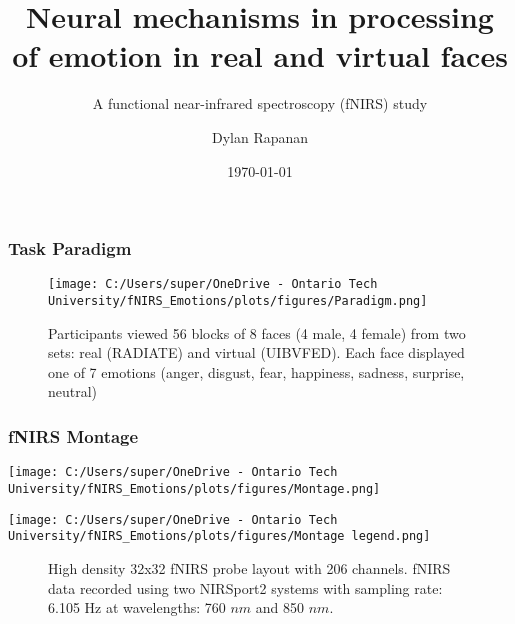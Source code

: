 \documentclass{beamer}
\title{Neural mechanisms in processing of emotion in real and virtual faces}
\subtitle{A functional near-infrared spectroscopy (fNIRS) study}
\author{Dylan Rapanan}
\date{\today}
\begin{document}
\begin{frame}
    \titlepage
\end{frame}

\begin{frame}
    \frametitle{Task Paradigm}
    \begin{figure}
        \centering
        \texttt{[image: C:/Users/super/OneDrive - Ontario Tech University/fNIRS\_Emotions/plots/figures/Paradigm.png]}
        \caption{Participants viewed 56 blocks of 8 faces (4 male, 4 female) from two sets:
        real (RADIATE) and virtual (UIBVFED). Each face displayed one of 7
        emotions (anger, disgust, fear, happiness, sadness, surprise, neutral)}
    \end{figure}
\end{frame}

\begin{frame}
    \frametitle{fNIRS Montage}
    \begin{minipage}[t]{0.55\textwidth}
        \vspace{-\baselineskip}
        \texttt{[image: C:/Users/super/OneDrive - Ontario Tech University/fNIRS\_Emotions/plots/figures/Montage.png]}
    \end{minipage}
    \begin{minipage}[t]{0.2\textwidth}
        \vspace{-\baselineskip}
        \texttt{[image: C:/Users/super/OneDrive - Ontario Tech University/fNIRS\_Emotions/plots/figures/Montage legend.png]}
    \end{minipage}
    \begin{figure}
        \caption{High density 32x32 fNIRS probe layout with 206 channels. \newline
        fNIRS data recorded using two NIRSport2 systems with sampling rate: 6.105 Hz at wavelengths: 760 $nm$ and 850 $nm$.}
    \end{figure}
\end{frame}
\end{document}
